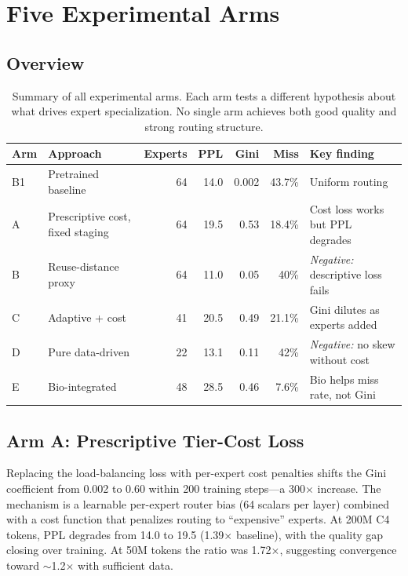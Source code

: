 \documentclass{article}
\begin{document}
\section{Five Experimental Arms}

\subsection{Overview}

\begin{table}[h]
\centering
\caption{Summary of all experimental arms. Each arm tests a different hypothesis about what drives expert specialization. No single arm achieves both good quality and strong routing structure.}
\label{tab:arms}
\begin{tabular}{@{}llrrrrp{4cm}@{}}
\toprule
Arm & Approach & Experts & PPL & Gini & Miss & Key finding \\
\midrule
B1 & Pretrained baseline & 64 & 14.0 & 0.002 & 43.7\% & Uniform routing \\
A & Prescriptive cost, fixed staging & 64 & 19.5 & 0.53 & 18.4\% & Cost loss works but PPL degrades \\
B & Reuse-distance proxy & 64 & 11.0 & 0.05 & 40\% & \textit{Negative:} descriptive loss fails \\
C & Adaptive + cost & 41 & 20.5 & 0.49 & 21.1\% & Gini dilutes as experts added \\
D & Pure data-driven & 22 & 13.1 & 0.11 & 42\% & \textit{Negative:} no skew without cost \\
E & Bio-integrated & 48 & 28.5 & 0.46 & 7.6\% & Bio helps miss rate, not Gini \\
\bottomrule
\end{tabular}
\end{table}

\subsection{Arm A: Prescriptive Tier-Cost Loss}

Replacing the load-balancing loss with per-expert cost penalties shifts the Gini coefficient from 0.002 to 0.60 within 200 training steps---a 300$\times$ increase. The mechanism is a learnable per-expert router bias (64 scalars per layer) combined with a cost function that penalizes routing to ``expensive'' experts. At 200M C4 tokens, PPL degrades from 14.0 to 19.5 (1.39$\times$ baseline), with the quality gap closing over training. At 50M tokens the ratio was 1.72$\times$, suggesting convergence toward $\sim$1.2$\times$ with sufficient data.
\end{document}
